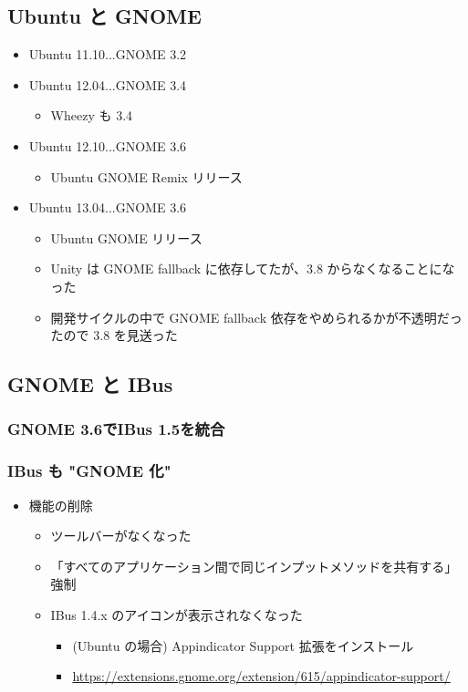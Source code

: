 \documentclass[mingoth,a4paper]{jsarticle}
\begin{document}
\subsection{Ubuntu と GNOME}
\begin{itemize}
  \item Ubuntu 11.10...GNOME 3.2
  \item Ubuntu 12.04...GNOME 3.4
  \begin{itemize}
    \item Wheezy も 3.4
  \end{itemize}
  \item Ubuntu 12.10...GNOME 3.6
  \begin{itemize}
    \item Ubuntu GNOME Remix リリース
  \end{itemize}
  \item Ubuntu 13.04...GNOME 3.6
  \begin{itemize}
    \item Ubuntu GNOME リリース
    \item Unity は GNOME fallback に依存してたが、3.8 からなくなることになった
    \item 開発サイクルの中で GNOME fallback 依存をやめられるかが不透明だったので 3.8 を見送った
  \end{itemize}
\end{itemize}

\subsection{GNOME と IBus}
\subsubsection{GNOME 3.6でIBus 1.5を統合}
\subsubsection{IBus も "GNOME 化"}
\begin{itemize}
  \item 機能の削除
  \begin{itemize}
    \item ツールバーがなくなった
    \item 「すべてのアプリケーション間で同じインプットメソッドを共有する」強制
    \item IBus 1.4.x のアイコンが表示されなくなった
    \begin{itemize}
      \item (Ubuntu の場合) Appindicator Support 拡張をインストール
      \item \url{https://extensions.gnome.org/extension/615/appindicator-support/}
    \end{itemize}
  \end{itemize}
\end{itemize}
\end{document}
